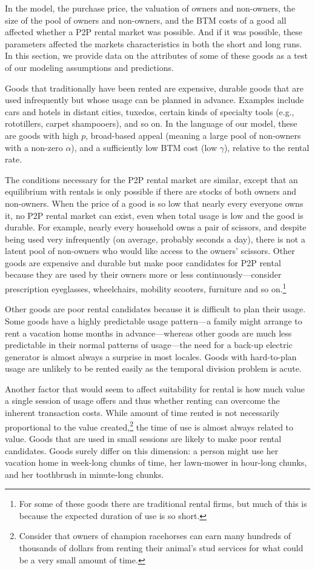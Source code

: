 \documentclass[11pt]{article}
\begin{document}
In the model, the purchase price, the valuation of owners and non-owners, the size of the pool of owners and non-owners, and the BTM costs of a good all affected whether a P2P rental market was possible.
And if it was possible, these parameters affected the markets
characteristics in both the short and long runs. 
In this section, we provide data on the attributes of some of these goods as a test of our modeling assumptions and predictions.  

Goods that traditionally have been rented are expensive, durable goods that are used infrequently but whose usage can be planned in advance.
Examples include cars and hotels in distant cities, tuxedos, certain kinds of specialty tools (e.g., rototillers, carpet shampooers), and so on.
In the language of our model, these are goods with high $p$, broad-based appeal (meaning a large pool of non-owners with a non-zero $\alpha$), and a sufficiently low BTM cost (low $\gamma$), relative to the rental rate. 

The conditions necessary for the P2P rental market are similar, except that an equilibrium with rentals is only possible if there are stocks of both owners and non-owners. 
When the price of a good is so low that nearly every everyone owns it, no P2P rental market can exist, even when total usage is low and the good is durable.
For example, nearly every household owns a pair of scissors, and despite being used very infrequently (on average, probably seconds a day), there is not a latent pool of non-owners who would like access to the owners' scissors.  
Other goods are expensive and durable but make poor candidates for P2P rental because they are used by their owners more or less continuously---consider prescription eyeglasses, wheelchairs, mobility scooters, furniture and so on.\footnote{
  For some of these goods there are traditional rental firms, but much of this is because the expected duration of use is so short.  
} 

Other goods are poor rental candidates because it is difficult to plan their usage.
Some goods have a highly predictable usage pattern---a family might arrange to rent a vacation home months in advance---whereas other goods are much less predictable in their normal patterns of usage---the need for a back-up electric generator is almost always a surprise in most locales.  
Goods with hard-to-plan usage are unlikely to be rented easily as the temporal division problem is acute.

Another factor that would seem to affect suitability for rental is how much value a single session of usage offers and thus whether renting can overcome the inherent transaction costs.
While amount of time rented is not necessarily proportional to the value created,\footnote{
  Consider that owners of champion racehorses can earn many hundreds of thousands of dollars from renting their animal's stud services for what could be a very small amount of time.}  
the time of use is almost always related to value.
Goods that are used in small sessions are likely to make poor rental candidates.
Goods surely differ on this dimension: 
a person might use her vacation home in week-long chunks of time, her lawn-mower in hour-long chunks, and her toothbrush in minute-long chunks. 
\end{document}

